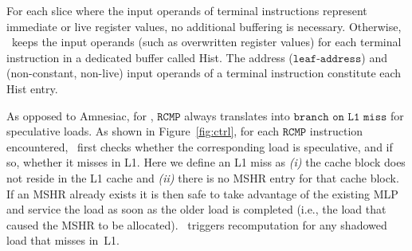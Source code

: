 For each slice  where the input operands of terminal instructions represent immediate or live
 register values, no additional buffering is necessary.
 Otherwise,  
\arch\ keeps the input operands (such as overwritten register values) for each terminal instruction in a dedicated buffer called Hist.
 The address ($\texttt{leaf-address}$) and (non-constant, non-live) input operands of a terminal
instruction constitute each Hist entry.

As opposed to Amnesiac, for \arch, $\texttt{RCMP}$ always translates into $\texttt{branch on L1 miss}$ for speculative loads. 
As shown in Figure~\ref{fig:ctrl}, for each $\texttt{RCMP}$ instruction encountered, \arch\ first checks whether the corresponding load is speculative, and if so, whether it misses in L1. %
Here we define an L1 miss as \textit{(i)} the cache block does not reside in the L1 cache and \textit{(ii)} there is no MSHR entry for that cache block. %
If an MSHR already exists it is then safe to take advantage of the existing MLP and service the load as soon as the older load is completed (i.e., the load that caused the MSHR to be allocated). %
\arch\ triggers recomputation for any shadowed load that misses in~L1. %

